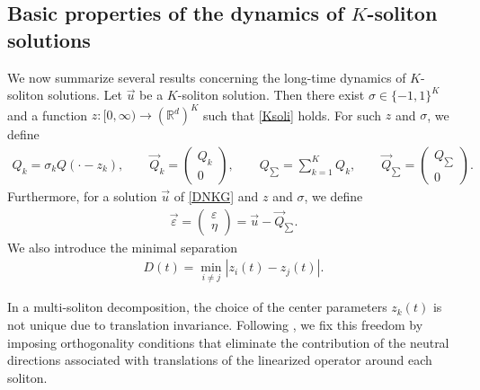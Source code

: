 \documentclass[reqno]{amsart}
\theoremstyle{plain}
\theoremstyle{definition}
\numberwithin{equation}{section}
\begin{document}
\subsection{Basic properties of the dynamics of $K$-soliton solutions}

We now summarize several results concerning the long-time dynamics of $K$-soliton solutions.
Let $\vec{u}$ be a $K$-soliton solution. Then there exist $\sigma\in\{-1,1\}^K$ and a function $z:[0,\infty)\to(\mathbb{R}^d)^K$ such that \eqref{Ksoli} holds.
For such $z$ and $\sigma$, we define
\begin{align*}
Q_k=\sigma_k Q(\cdot-z_k),\qquad
\vec{Q}_k=
\begin{pmatrix}
Q_k\\
0
\end{pmatrix},
\qquad
Q_{\sum}=\sum_{k=1}^KQ_k,\qquad
\vec{Q}_{\sum}=
\begin{pmatrix}
Q_{\sum}\\
0
\end{pmatrix}.
\end{align*}
Furthermore, for a solution $\vec{u}$ of \eqref{DNKG} and $z$ and $\sigma$, we define
\begin{align*}
\vec{\varepsilon}=
\begin{pmatrix}
\varepsilon\\
\eta
\end{pmatrix}
=\vec{u}-\vec{Q}_{\sum}.
\end{align*}
We also introduce the minimal separation
\begin{align*}
D(t)=\min_{i\neq j}|z_i(t)-z_j(t)|.
\end{align*}

In a multi-soliton decomposition, the choice of the center parameters $z_k(t)$ is not unique due to translation invariance.
Following \cite[Lemma 3.2]{I2}, we fix this freedom by imposing orthogonality conditions that eliminate the contribution of the neutral directions associated with translations of the linearized operator around each soliton.
\end{document}
